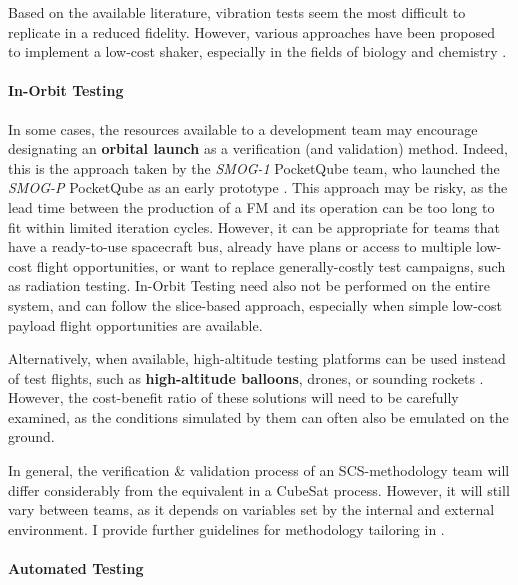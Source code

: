 \documentclass[a4paper,nobib,justified,final]{tufte-book}
\begin{document}
Based on the available literature, vibration tests seem the most difficult to replicate in a reduced fidelity. However, various approaches have been proposed to implement a low-cost shaker, especially in the fields of biology and chemistry \autocite{hollinghamOpenHW3OpensourceLowcost2024,diaz-roncerosDesignImplementationLowcost2023}.

\paragraph{In-Orbit Testing}
In some cases, the resources available to a development team may encourage designating an \textbf{orbital launch} as a verification (and validation) method. Indeed, this is the approach taken by the \emph{SMOG-1} PocketQube team, who launched the \emph{SMOG-P} PocketQube as an early prototype \autocite{SMOG14thHungarian2021}.
This approach may be risky, as the lead time between the production of a \acl{FM} and its operation can be too long to fit within limited iteration cycles. However, it can be appropriate for teams that have a ready-to-use spacecraft bus, already have plans or access to multiple low-cost flight opportunities, or want to replace generally-costly test campaigns, such as radiation testing.
In-Orbit Testing need also not be performed on the entire system, and can follow the slice-based approach, especially when simple low-cost payload flight opportunities are available.

Alternatively, when available, high-altitude testing platforms can be used instead of test flights, such as \textbf{high-altitude balloons}, drones, or sounding rockets \autocite{berthoudHowSetCubeSat2016,WikisatWiki}. However, the cost-benefit ratio of these solutions will need to be carefully examined, as the conditions simulated by them can often also be emulated on the ground.

In general, the verification \& validation process of an \ac{SCS}-methodology team will differ considerably from the equivalent in a CubeSat process.
However, it will still vary between teams, as it depends on variables set by the internal and external environment. I provide further guidelines for methodology tailoring in .

\paragraph{Automated Testing}
\label{sec:METHODOLOGY_automated_testing}
\end{document}
